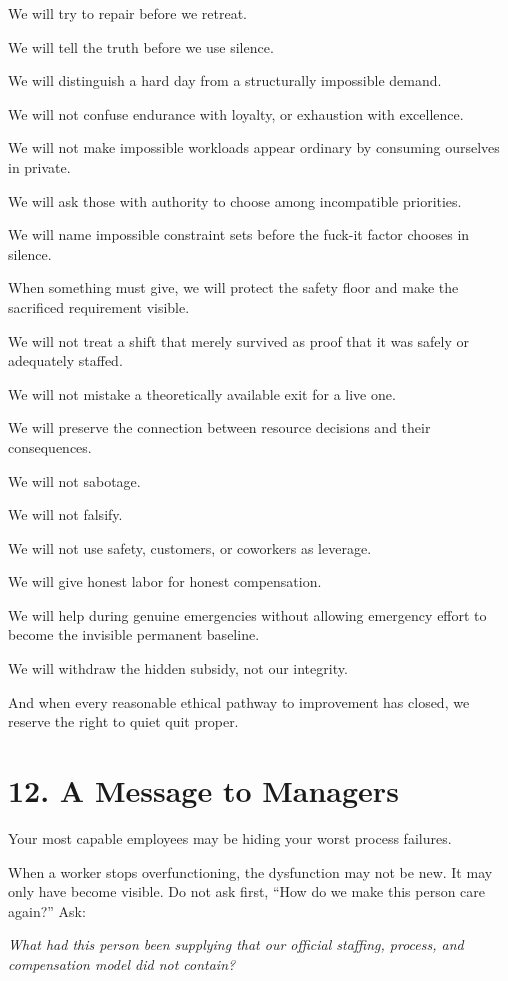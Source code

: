 \documentclass[11pt,oneside]{article}
\renewenvironment{quote}
  {\begin{tcolorbox}[
      enhanced,
      breakable,
      colback=ManifestLight,
      colframe=ManifestRule,
      boxrule=0pt,
      leftrule=3pt,
      arc=0pt,
      outer arc=0pt,
      left=10pt,right=10pt,top=8pt,bottom=8pt,
      before skip=0.8em,after skip=0.8em
    ]\itshape}
  {\end{tcolorbox}}
\begin{document}
We will try to repair before we retreat.

We will tell the truth before we use silence.

We will distinguish a hard day from a structurally impossible demand.

We will not confuse endurance with loyalty, or exhaustion with
excellence.

We will not make impossible workloads appear ordinary by consuming
ourselves in private.

We will ask those with authority to choose among incompatible
priorities.

We will name impossible constraint sets before the fuck-it factor
chooses in silence.

When something must give, we will protect the safety floor and make the
sacrificed requirement visible.

We will not treat a shift that merely survived as proof that it was
safely or adequately staffed.

We will not mistake a theoretically available exit for a live one.

We will preserve the connection between resource decisions and their
consequences.

We will not sabotage.

We will not falsify.

We will not use safety, customers, or coworkers as leverage.

We will give honest labor for honest compensation.

We will help during genuine emergencies without allowing emergency
effort to become the invisible permanent baseline.

We will withdraw the hidden subsidy, not our integrity.

And when every reasonable ethical pathway to improvement has closed, we
reserve the right to quiet quit proper.

\section{12. A Message to Managers}\label{a-message-to-managers}

Your most capable employees may be hiding your worst process failures.

When a worker stops overfunctioning, the dysfunction may not be new. It
may only have become visible. Do not ask first, ``How do we make this
person care again?'' Ask:

\begin{quote}
What had this person been supplying that our official staffing, process,
and compensation model did not contain?
\end{quote}
\end{document}
